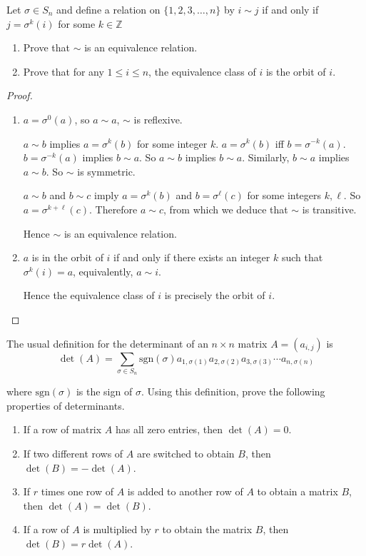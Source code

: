 \newpage
\begin{exercise}
    Let $\sigma\in S_{n}$ and define a relation on $\{ 1, 2, 3, \ldots, n \}$ by $i\sim j$ if and only if $j = \sigma^{k}(i)$ for some $k\in\mathbb{Z}$
    \begin{enumerate}[label={\textbf{\arabic*.}}]
        \item Prove that $\sim$ is an equivalence relation.
        \item Prove that for any $1\leq i\leq n$, the equivalence class of $i$ is the orbit of $i$.
    \end{enumerate}
\end{exercise}

\begin{proof}
    \begin{enumerate}[label={\textbf{\arabic*.}}]
        \item $a = \sigma^{0}(a)$, so $a\sim a$, $\sim$ is reflexive.

              $a\sim b$ implies $a = \sigma^{k}(b)$ for some integer $k$. $a = \sigma^{k}(b)$ iff $b = \sigma^{-k}(a)$. $b = \sigma^{-k}(a)$ implies $b\sim a$. So $a\sim b$ implies $b\sim a$. Similarly, $b\sim a$ implies $a\sim b$. So $\sim$ is symmetric.

              $a\sim b$ and $b\sim c$ imply $a = \sigma^{k}(b)$ and $b = \sigma^{\ell}(c)$ for some integers $k, \ell$. So $a = \sigma^{k+\ell}(c)$. Therefore $a\sim c$, from which we deduce that $\sim$ is transitive.

              Hence $\sim$ is an equivalence relation.
        \item $a$ is in the orbit of $i$ if and only if there exists an integer $k$ such that $\sigma^{k}(i) = a$, equivalently, $a\sim i$.

              Hence the equivalence class of $i$ is precisely the orbit of $i$.
    \end{enumerate}
\end{proof}

\newpage
\begin{exercise}
    The usual definition for the determinant of an $n\times n$ matrix $A = {(a_{i,j})}$ is
    \[
        \det(A) = \sum_{\sigma\in S_{n}}\text{sgn}(\sigma)a_{1,\sigma(1)}a_{2,\sigma(2)}a_{3,\sigma(3)}\cdots a_{n,\sigma(n)}
    \]

    where $\text{sgn}(\sigma)$ is the sign of $\sigma$. Using this definition, prove the following properties of determinants.
    \begin{enumerate}[label={\textbf{\alph*.}}]
        \item If a row of matrix $A$ has all zero entries, then $\det(A) = 0$.
        \item If two different rows of $A$ are switched to obtain $B$, then $\det(B) = -\det(A)$.
        \item If $r$ times one row of $A$ is added to another row of $A$ to obtain a matrix $B$, then $\det(A) = \det(B)$.
        \item If a row of $A$ is multiplied by $r$ to obtain the matrix $B$, then $\det(B) = r\det(A)$.
    \end{enumerate}
\end{exercise}


